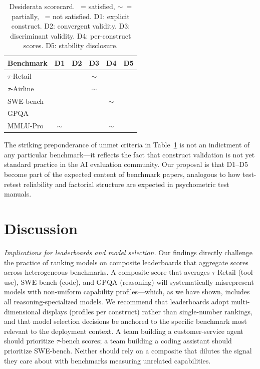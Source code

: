 \documentclass[11pt]{article}
\newcommand{\cmark}{\ding{51}}
\newcommand{\xmark}{\ding{55}}
\newcommand{\pmark}{$\sim$}
\begin{document}
\begin{table}[h]
\caption{Desiderata scorecard. \cmark~= satisfied, \pmark~= partially, \xmark~= not satisfied. D1: explicit construct. D2: convergent validity. D3: discriminant validity. D4: per-construct scores. D5: stability disclosure.}
\label{tab:scorecard}
\begin{tabular}{lccccc}
\toprule
Benchmark & D1 & D2 & D3 & D4 & D5 \\
\midrule
$\tau$-Retail & \cmark & \xmark & \pmark & \cmark & \xmark \\
$\tau$-Airline & \cmark & \xmark & \pmark\footnotemark & \cmark & \xmark \\
SWE-bench & \cmark & \xmark & \xmark & \pmark & \xmark \\
GPQA & \cmark & \xmark & \xmark & \xmark & \xmark \\
MMLU-Pro & \pmark & \xmark & \xmark & \pmark & \xmark \\
\bottomrule
\end{tabular}
\end{table}

The striking preponderance of unmet criteria in Table~\ref{tab:scorecard} is not an indictment of any particular benchmark---it reflects the fact that construct validation is not yet standard practice in the AI evaluation community. Our proposal is that D1--D5 become part of the expected content of benchmark papers, analogous to how test-retest reliability and factorial structure are expected in psychometric test manuals.

\section{Discussion}
\textit{Implications for leaderboards and model selection.} Our findings directly challenge the practice of ranking models on composite leaderboards that aggregate scores across heterogeneous benchmarks. A composite score that averages $\tau$-Retail (tool-use), SWE-bench (code), and GPQA (reasoning) will systematically misrepresent models with non-uniform capability profiles---which, as we have shown, includes all reasoning-specialized models. We recommend that leaderboards adopt multi-dimensional displays (profiles per construct) rather than single-number rankings, and that model selection decisions be anchored to the specific benchmark most relevant to the deployment context. A team building a customer-service agent should prioritize $\tau$-bench scores; a team building a coding assistant should prioritize SWE-bench. Neither should rely on a composite that dilutes the signal they care about with benchmarks measuring unrelated capabilities.
\end{document}
